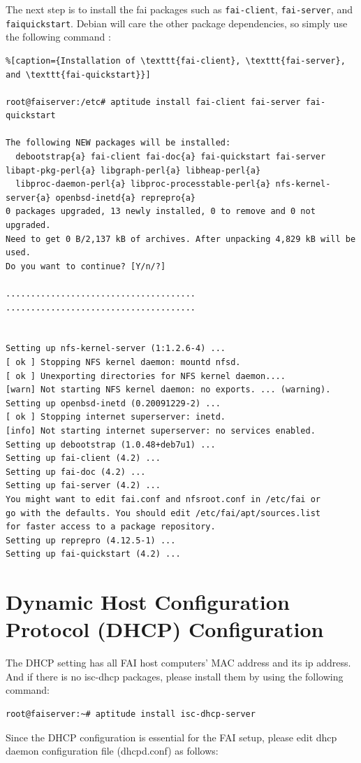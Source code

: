 \documentclass[11pt
  , a4paper
  , article
  , oneside
]{memoir}
\begin{document}
The next step is to install the fai packages such as \texttt{fai-client}, \texttt{fai-server}, and \texttt{fai\-quickstart}. Debian will care the other package dependencies, so simply use the following command : 

\begin{lstlisting}%[caption={Installation of \texttt{fai-client}, \texttt{fai-server}, and \texttt{fai-quickstart}}]

root@faiserver:/etc# aptitude install fai-client fai-server fai-quickstart

The following NEW packages will be installed:
  debootstrap{a} fai-client fai-doc{a} fai-quickstart fai-server libapt-pkg-perl{a} libgraph-perl{a} libheap-perl{a} 
  libproc-daemon-perl{a} libproc-processtable-perl{a} nfs-kernel-server{a} openbsd-inetd{a} reprepro{a} 
0 packages upgraded, 13 newly installed, 0 to remove and 0 not upgraded.
Need to get 0 B/2,137 kB of archives. After unpacking 4,829 kB will be used.
Do you want to continue? [Y/n/?] 

......................................
......................................


Setting up nfs-kernel-server (1:1.2.6-4) ...
[ ok ] Stopping NFS kernel daemon: mountd nfsd.
[ ok ] Unexporting directories for NFS kernel daemon....
[warn] Not starting NFS kernel daemon: no exports. ... (warning).
Setting up openbsd-inetd (0.20091229-2) ...
[ ok ] Stopping internet superserver: inetd.
[info] Not starting internet superserver: no services enabled.
Setting up debootstrap (1.0.48+deb7u1) ...
Setting up fai-client (4.2) ...
Setting up fai-doc (4.2) ...
Setting up fai-server (4.2) ...
You might want to edit fai.conf and nfsroot.conf in /etc/fai or
go with the defaults. You should edit /etc/fai/apt/sources.list
for faster access to a package repository.
Setting up reprepro (4.12.5-1) ...
Setting up fai-quickstart (4.2) ...

\end{lstlisting}


\section{Dynamic Host Configuration Protocol (DHCP) Configuration}
The DHCP setting has all FAI host computers' MAC address and its ip address. And if there is no isc-dhcp packages, please install them by using the following command:
\begin{lstlisting}
root@faiserver:~# aptitude install isc-dhcp-server
\end{lstlisting}
Since the DHCP configuration is essential for the FAI setup, please edit dhcp daemon configuration file (dhcpd.conf) as follows:
\end{document}
